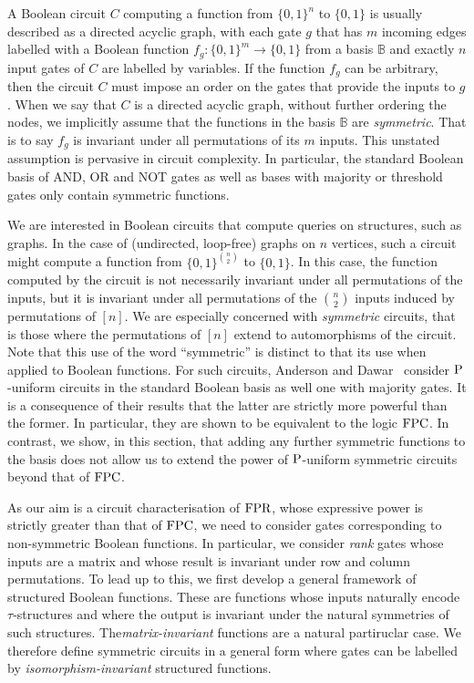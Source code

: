 \documentclass[../paper.tex]{subfiles}
\begin{document}


A Boolean circuit $C$ computing a function from $\{0,1\}^n$ to $\{0,1\}$ is
usually described as a directed acyclic graph, with each gate $g$ that has $m$
incoming edges labelled with a Boolean function $f_g : \{0,1\}^m \rightarrow
\{0,1\}$ from a basis $\mathbb{B}$ and exactly $n$ input gates of $C$ are
labelled by variables. If the function $f_g$ can be arbitrary, then the circuit
$C$ must impose an order on the gates that provide the inputs to $g$. When we
say that $C$ is a directed acyclic graph, without further ordering the nodes, we
implicitly assume that the functions in the basis $\mathbb{B}$ are
\emph{symmetric}. That is to say $f_g$ is invariant under all permutations of
its $m$ inputs. This unstated assumption is pervasive in circuit complexity. In
particular, the standard Boolean basis of AND, OR and NOT gates as well as bases
with majority or threshold gates only contain symmetric functions.

We are interested in Boolean circuits that compute queries on structures, such
as graphs. In the case of (undirected, loop-free) graphs on $n$ vertices, such a
circuit might compute a function from $\{0,1\}^{n \choose 2}$ to $\{0,1\}$. In
this case, the function computed by the circuit is not necessarily invariant
under all permutations of the inputs, but it is invariant under all permutations
of the $n \choose 2$ inputs induced by permutations of $[n]$. We are especially
concerned with \emph{symmetric} circuits, that is those where the permutations
of $[n]$ extend to automorphisms of the circuit. Note that this use of the word
``symmetric'' is distinct to that its use when applied to Boolean functions. For
such circuits, Anderson and Dawar~\cite{AndersonD17} consider $\mathrm{P}$-uniform
circuits in the standard Boolean basis as well one with majority gates. It is a
consequence of their results that the latter are strictly more powerful than the
former. In particular, they are shown to be equivalent to the logic $\text{\upshape FPC}$. In
contrast, we show, in this section, that adding any further symmetric functions
to the basis does not allow us to extend the power of $\mathrm{P}$-uniform symmetric
circuits beyond that of $\text{\upshape FPC}$.

As our aim is a circuit characterisation of $\text{\upshape FPR}$, whose expressive power is
strictly greater than that of $\text{\upshape FPC}$, we need to consider gates corresponding to
non-symmetric Boolean functions. In particular, we consider \emph{rank} gates
whose inputs are a matrix and whose result is invariant under row and column
permutations. To lead up to this, we first develop a general framework of
structured Boolean functions. These are functions whose inputs naturally encode
$\tau$-structures and where the output is invariant under the natural symmetries
of such structures. The\emph{matrix-invariant} functions are a natural
partiruclar case. We therefore define symmetric circuits in a general form where
gates can be labelled by \emph{isomorphism-invariant} structured functions.
\end{document}
